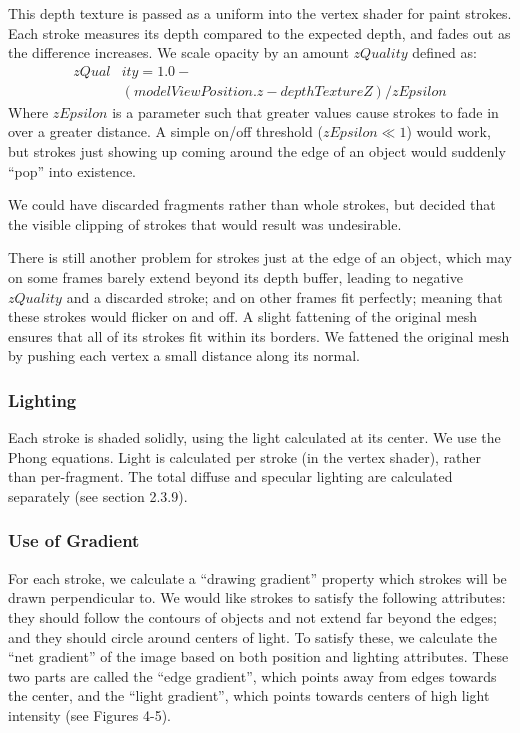 \documentclass[conference]{acmsiggraph}
\begin{document}
This depth texture is passed as a uniform into the vertex shader for paint
strokes. Each stroke measures its depth compared to the expected depth, and
fades out as the difference increases. We scale opacity by an amount
$zQuality$ defined as:
\begin{align*}
zQual&ity = 1.0 - \\
           &(modelViewPosition.z - depthTextureZ) / zEpsilon
\end{align*}
Where $zEpsilon$ is a parameter such that greater values cause strokes to fade in
over a greater distance. A simple on/off threshold ($zEpsilon \ll 1$) would
work, but strokes just showing up coming around the edge of an object would
suddenly ``pop'' into existence.

We could have discarded fragments rather than whole strokes, but decided that
the visible clipping of strokes that would result was undesirable.

There is still another problem for strokes just at the edge of an object, which
may on some frames barely extend beyond its depth buffer, leading to negative
$zQuality$ and a discarded stroke; and on other frames fit perfectly; meaning
that these strokes would flicker on and off. A slight fattening of the original
mesh ensures that all of its strokes fit within its borders. We fattened the
original mesh by pushing each vertex a small distance along its normal.

\subsubsection{Lighting}

Each stroke is shaded solidly, using the light calculated at its center. We use
the Phong equations. Light is calculated per stroke (in the vertex shader),
rather than per-fragment. The total diffuse and specular lighting are
calculated separately (see section 2.3.9).


\subsubsection{Use of Gradient}

For each stroke, we calculate a ``drawing gradient'' property which strokes
will be drawn perpendicular to. We would like strokes to satisfy the following
attributes: they should follow the contours of objects and not extend far
beyond the edges; and they should circle around centers of light. To satisfy
these, we calculate the ``net gradient'' of the image based on both position
and lighting attributes. These two parts are called the ``edge gradient'',
which points away from edges towards the center, and the ``light gradient'',
which points towards centers of high light intensity (see Figures 4-5).
\end{document}
